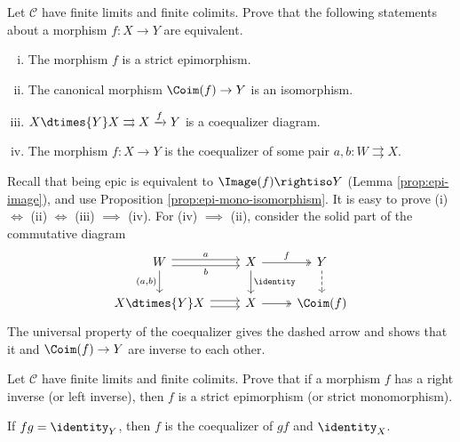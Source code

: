 \begin{Exercises}
	\item Let $\mathcal{C}$ have finite limits and finite colimits. Prove that
	the following statements about a morphism $f:X\to Y$ are equivalent.
	\begin{enumerate}[(i)]
		\item The morphism $f$ is a strict epimorphism.
		\item The canonical morphism $\Coim(f)\to Y$ is an isomorphism.
		\item $X\dtimes{Y}X\rightrightarrows X\xrightarrow{f}Y$ is a coequalizer
		diagram.
		\item The morphism $f:X\to Y$ is the coequalizer of some pair
		$a,b:W\rightrightarrows X$.
	\end{enumerate}
	\begin{hint}
		Recall that being epic is equivalent to $\Image(f)\rightiso Y$ (Lemma
		\ref{prop:epi-image}), and use Proposition
		\ref{prop:epi-mono-isomorphism}. It is easy to prove
		(i) $\iff$ (ii) $\iff$ (iii) $\implies$ (iv). For
		(iv) $\implies$ (ii), consider the solid part of the commutative diagram
		\[\begin{tikzcd}
			W \arrow[shift left, r, "a"] \arrow[shift right, r, "b"'] \arrow[d, "{(a, b)}"'] & X \arrow[d, "\identity"] \arrow[twoheadrightarrow, r, "f"] & Y \arrow[dashed, d] \\
			X \dtimes{Y} X \arrow[shift left, r] \arrow[shift right, r] & X \arrow[twoheadrightarrow, r] & \Coim(f)
		\end{tikzcd}\]
		The universal property of the coequalizer gives the dashed arrow and
		shows that it and $\Coim(f)\to Y$ are inverse to each other.
	\end{hint}

	\item Let $\mathcal{C}$ have finite limits and finite colimits. Prove that
	if a morphism $f$ has a right inverse (or left inverse), then $f$ is a
	strict epimorphism (or strict monomorphism).
	\begin{hint}
		If $fg=\identity_Y$, then $f$ is the coequalizer of $gf$ and
		$\identity_X$.
	\end{hint}


\end{Exercises}
